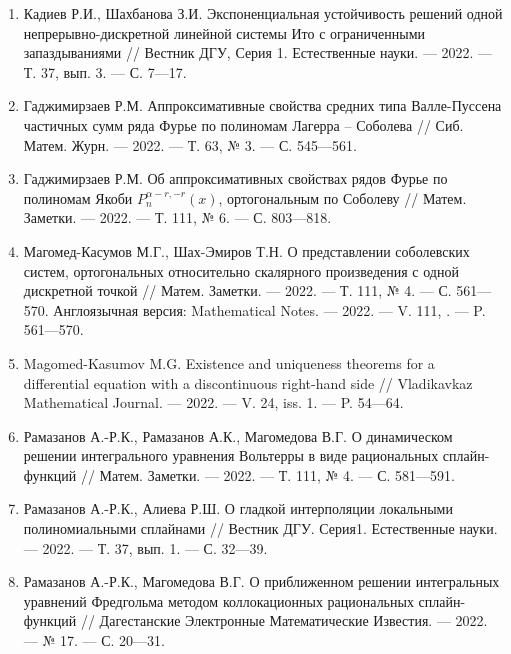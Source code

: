 \begin{enumerate}[1]
    \item
    Кадиев Р.И., Шахбанова З.И.
    Экспоненциальная устойчивость решений одной непрерывно-дискретной линейной системы Ито с ограниченными запаздываниями
    //
    Вестник ДГУ, Серия 1. Естественные науки.
    --- 2022.
    --- Т. 37, вып. 3.
    --- С. 7---17.



    \item
    Гаджимирзаев Р.М.
    Аппроксимативные свойства средних типа Валле-Пуссена частичных сумм ряда Фурье по полиномам Лагерра – Соболева
    //
    Сиб. Матем. Журн.
    --- 2022.
    --- Т. 63, № 3.
    --- С. 545---561.

    \item
    Гаджимирзаев Р.М.
    Об аппроксимативных свойствах рядов Фурье по полиномам Якоби $P_n^{\alpha - r,-r}(x)$, ортогональным по Соболеву
    //
    Матем. Заметки.
    --- 2022.
    --- Т. 111, № 6.
    --- С. 803---818.



    \item
    Магомед-Касумов М.Г., Шах-Эмиров Т.Н.
    О представлении соболевских систем, ортогональных относительно скалярного произведения с одной дискретной точкой
    //
    Матем. Заметки.
    --- 2022.
    --- Т. 111, № 4.
    --- С. 561---570.
    Англоязычная версия:
    Mathematical Notes.
    --- 2022.
    --- V. 111, .
    --- P. 561---570.

    \item
    Magomed-Kasumov M.G.
    Existence and uniqueness theorems for a differential equation with a discontinuous right-hand side
    //
    Vladikavkaz Mathematical Journal.
    --- 2022.
    --- V. 24, iss. 1.
    --- P. 54---64.



    \item
    Рамазанов А.-Р.К., Рамазанов А.К., Магомедова В.Г.
    О динамическом решении интегрального уравнения Вольтерры в виде рациональных сплайн-функций
    //
    Матем. Заметки.
    --- 2022.
    --- Т. 111, № 4.
    --- С. 581---591.

    \item
    Рамазанов А.-Р.К., Алиева Р.Ш.
    О гладкой интерполяции локальными полиномиальными сплайнами
    //
    Вестник ДГУ. Серия1. Естественные науки.
    --- 2022.
    --- Т. 37, вып. 1.
    --- С. 32---39.

    \item
    Рамазанов А.-Р.К., Магомедова В.Г.
    О приближенном решении интегральных уравнений Фредгольма методом коллокационных рациональных сплайн-функций
    //
    Дагестанские Электронные Математические Известия.
    --- 2022.
    --- № 17.
    --- С. 20---31.



\end{enumerate}
